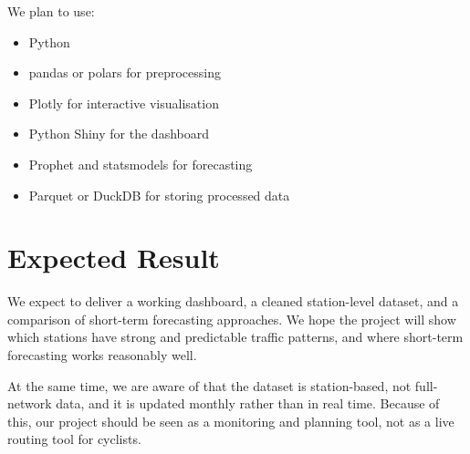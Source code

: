 \documentclass[11pt]{article}
\begin{document}
We plan to use:

\begin{itemize}
    \item Python
    \item pandas or polars for preprocessing
    \item Plotly for interactive visualisation
    \item Python Shiny for the dashboard
    \item Prophet and statsmodels for forecasting
    \item Parquet or DuckDB for storing processed data
\end{itemize}

\section{Expected Result}

We expect to deliver a working dashboard, a cleaned station-level dataset, and a comparison of short-term forecasting approaches. We hope the project will show which stations have strong and predictable traffic patterns, and where short-term forecasting works reasonably well.

At the same time, we are aware of that the dataset is station-based, not full-network data, and it is updated monthly rather than in real time. Because of this, our project should be seen as a monitoring and planning tool, not as a live routing tool for cyclists.
\end{document}
